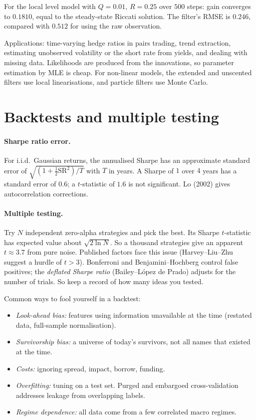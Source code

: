 \begin{numcheck}
For the local level model with $Q=0.01$, $R=0.25$ over $500$ steps: gain converges to $0.1810$, equal to the steady-state Riccati solution. The filter's RMSE is $0.246$, compared with $0.512$ for using the raw observation.
\end{numcheck}

Applications: time-varying hedge ratios in pairs trading, trend extraction, estimating unobserved volatility or the short rate from yields, and dealing with missing data. Likelihoods are produced from the innovations, so parameter estimation by MLE is cheap. For non-linear models, the extended and unscented filters use local linearisations, and particle filters use Monte Carlo.

\section{Backtests and multiple testing}

\paragraph{Sharpe ratio error.} For i.i.d.\ Gaussian returns, the annualised Sharpe has an approximate standard error of $\sqrt{(1+\tfrac12\mathrm{SR}^2)/T}$ with $T$ in years. A Sharpe of $1$ over $4$ years has a standard error of $0.6$; a $t$-statistic of $1.6$ is not significant. Lo (2002) gives autocorrelation corrections.

\paragraph{Multiple testing.} Try $N$ independent zero-alpha strategies and pick the best. Its Sharpe $t$-statistic has expected value about $\sqrt{2\ln N}$. So a thousand strategies give an apparent $t\approx3.7$ from pure noise. Published factors face this issue (Harvey--Liu--Zhu suggest a hurdle of $t>3$). Bonferroni and Benjamini--Hochberg control false positives; the \emph{deflated Sharpe ratio} (Bailey--L\'opez de Prado) adjusts for the number of trials. So keep a record of how many ideas you tested.

\begin{pitfall}
Common ways to fool yourself in a backtest:
\begin{itemize}
\item \emph{Look-ahead bias:} features using information unavailable at the time (restated data, full-sample normalisation).
\item \emph{Survivorship bias:} a universe of today's survivors, not all names that existed at the time.
\item \emph{Costs:} ignoring spread, impact, borrow, funding.
\item \emph{Overfitting:} tuning on a test set. Purged and embargoed cross-validation addresses leakage from overlapping labels.
\item \emph{Regime dependence:} all data come from a few correlated macro regimes.
\end{itemize}
\end{pitfall}

